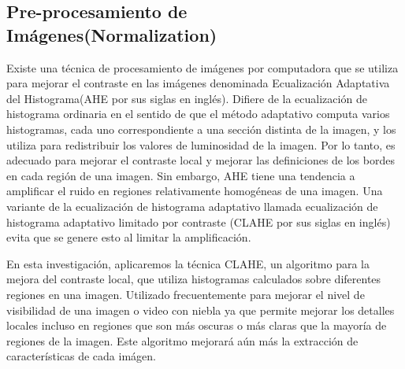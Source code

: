 	\subsection{Pre-procesamiento de Imágenes(Normalization)}
		Existe una técnica de procesamiento de imágenes por computadora que se utiliza para mejorar el contraste en las imágenes denominada Ecualización Adaptativa del Histograma(AHE por sus siglas en inglés). Difiere de la ecualización de histograma ordinaria en el sentido de que el método adaptativo computa varios histogramas, cada uno correspondiente a una sección distinta de la imagen, y los utiliza para redistribuir los valores de luminosidad de la imagen. Por lo tanto, es adecuado para mejorar el contraste local y mejorar las definiciones de los bordes en cada región de una imagen. Sin embargo, AHE tiene una tendencia a amplificar el ruido en regiones relativamente homogéneas de una imagen. Una variante de la ecualización de histograma adaptativo llamada ecualización de histograma adaptativo limitado por contraste (CLAHE por sus siglas en inglés) evita que se genere esto al limitar la amplificación.

		En esta investigación, aplicaremos la técnica CLAHE, un algoritmo para la mejora del contraste local, que utiliza histogramas calculados sobre diferentes regiones en una imagen. Utilizado frecuentemente para mejorar el nivel de visibilidad de una imagen o video con niebla ya que permite mejorar los detalles locales incluso en regiones que son más oscuras o más claras que la mayoría de regiones de la imagen. Este algoritmo mejorará aún más la extracción de características de cada imágen.\citep{CLAHE}

